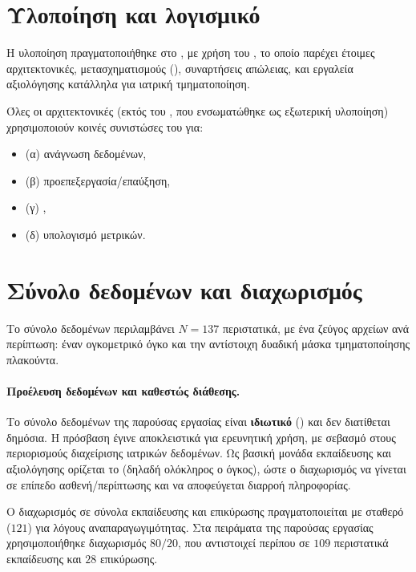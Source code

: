 \section{Υλοποίηση και λογισμικό}
\label{sec:exp_software}

Η υλοποίηση πραγματοποιήθηκε στο ,
με χρήση του  \cite{cardoso2022monai}, το οποίο παρέχει έτοιμες
αρχιτεκτονικές, μετασχηματισμούς (), συναρτήσεις απώλειας,
και εργαλεία αξιολόγησης κατάλληλα για  ιατρική τμηματοποίηση.

Όλες οι αρχιτεκτονικές (εκτός του , που ενσωματώθηκε ως
εξωτερική υλοποίηση) χρησιμοποιούν κοινές συνιστώσες του  για:
\begin{itemize}
  \item (α) ανάγνωση  δεδομένων,
  \item (β) προεπεξεργασία/επαύξηση, 
  \item (γ) ,
  \item (δ) υπολογισμό μετρικών.
\end{itemize}

\section{Σύνολο δεδομένων και διαχωρισμός}
\label{sec:exp_data}

Το σύνολο δεδομένων περιλαμβάνει $N=137$ περιστατικά, με ένα ζεύγος αρχείων
 ανά περίπτωση: έναν ογκομετρικό όγκο  και την
αντίστοιχη δυαδική μάσκα τμηματοποίησης πλακούντα.
\paragraph{Προέλευση δεδομένων και καθεστώς διάθεσης.}
Το σύνολο δεδομένων της παρούσας εργασίας είναι \textbf{ιδιωτικό} ()
και δεν διατίθεται δημόσια. Η πρόσβαση έγινε αποκλειστικά για ερευνητική χρήση,
με σεβασμό στους περιορισμούς διαχείρισης ιατρικών δεδομένων.
Ως βασική μονάδα εκπαίδευσης και αξιολόγησης ορίζεται το 
(δηλαδή ολόκληρος ο  όγκος), ώστε ο διαχωρισμός να γίνεται σε επίπεδο
ασθενή/περίπτωσης και να αποφεύγεται διαρροή πληροφορίας.

Ο διαχωρισμός σε σύνολα εκπαίδευσης και επικύρωσης πραγματοποιείται με
σταθερό  ($121$) για λόγους αναπαραγωγιμότητας.
Στα πειράματα της παρούσας εργασίας χρησιμοποιήθηκε διαχωρισμός $80/20$,
που αντιστοιχεί περίπου σε $109$ περιστατικά εκπαίδευσης και $28$ επικύρωσης.

